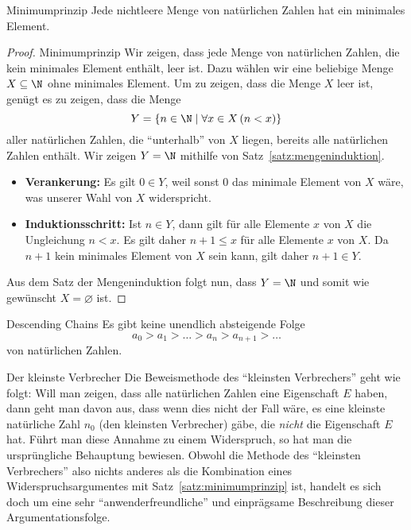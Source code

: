 \begin{lemma}{Minimumprinzip}
Jede nichtleere Menge von natürlichen Zahlen hat ein minimales Element.
\end{lemma}
\begin{proof}{Minimumprinzip}
Wir zeigen, dass jede Menge von natürlichen Zahlen, die kein minimales Element enthält, leer ist. Dazu wählen wir eine beliebige Menge $X\subseteq\N$ ohne minimales Element. Um zu zeigen, dass die Menge $X$ leer ist, genügt es zu zeigen, dass die Menge
\[
Y=\{n\in\N\mid \forall x\in X\,(n<x) \}
\]
aller natürlichen Zahlen, die ``unterhalb'' von $X$ liegen, bereits alle natürlichen Zahlen enthält. Wir zeigen $Y=\N$ mithilfe von Satz~\ref{satz:mengeninduktion}.
\begin{itemize}
\item \textbf{Verankerung:} Es gilt $0\in Y$, weil sonst $0$ das minimale Element von $X$ wäre, was unserer Wahl von $X$ widerspricht.
\item \textbf{Induktionsschritt:} Ist $n\in Y$, dann gilt für alle Elemente $x$ von $X$ die Ungleichung $n<x$. Es gilt daher $n+1\leq x$ für alle Elemente $x$ von $X$. Da $n+1$ kein minimales Element von $X$ sein kann, gilt daher $n+1\in Y$.
\end{itemize}
Aus dem Satz der Mengeninduktion folgt nun, dass $Y=\N$ und somit wie gewünscht $X=\varnothing$ ist.
\end{proof}

\begin{lemma}{Descending Chains}
Es gibt keine unendlich absteigende Folge
\[
a_0>a_1>\dots >a_n>a_{n+1}>\dots
\]
von natürlichen Zahlen.
\end{lemma}

\begin{howto}{Der kleinste Verbrecher}
Die Beweismethode des ``kleinsten Verbrechers'' geht wie folgt: Will man zeigen, dass alle natürlichen Zahlen eine Eigenschaft $E$ haben, dann geht man davon aus, dass wenn dies nicht der Fall wäre, es eine kleinste natürliche Zahl $n_0$ (den kleinsten Verbrecher) gäbe, die \textit{nicht} die Eigenschaft $E$ hat. Führt man diese Annahme zu einem Widerspruch, so hat man die ursprüngliche Behauptung bewiesen. Obwohl die Methode des ``kleinsten Verbrechers'' also nichts anderes als die Kombination eines Widerspruchsargumentes mit Satz~\ref{satz:minimumprinzip} ist, handelt es sich doch um eine sehr ``anwenderfreundliche'' und einprägsame Beschreibung dieser Argumentationsfolge.
\end{howto}

